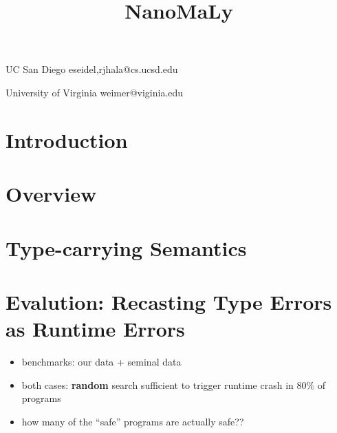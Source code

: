 \documentclass[10pt,pldi,indentedstyle=false]{sigplanconf-pldi15}
\theoremstyle{plain}%
\theoremstyle{definition}
\begin{document}
%
%

\title{NanoMaLy}

           {UC San Diego}
           {{eseidel,rjhala}@cs.ucsd.edu}

           {University of Virginia}
           {weimer@viginia.edu}

\maketitle
\begin{abstract}
\end{abstract}



\section{Introduction}          %
\section{Overview}              %
\section{Type-carrying Semantics} %





\section{Evalution: Recasting Type Errors as Runtime Errors} %
\label{sec:eval-recast-type}
\begin{itemize}
\item benchmarks: our data + seminal data
\item both cases: \textbf{random} search sufficient to trigger runtime crash in 80\% of programs
\item how many of the ``safe'' programs are actually safe??
\end{itemize}
\end{document}
